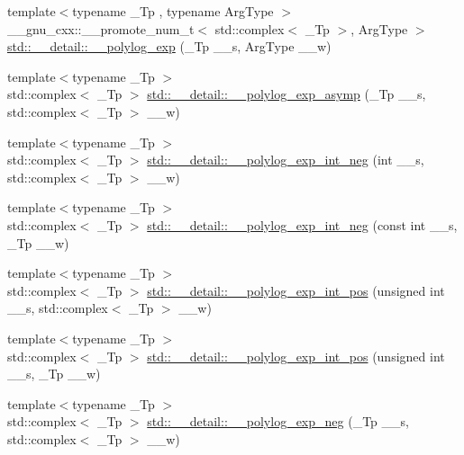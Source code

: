 \begin{DoxyCompactItemize}
\item 
{\footnotesize template$<$typename \+\_\+\+Tp , typename Arg\+Type $>$ }\\\+\_\+\+\_\+gnu\+\_\+cxx\+::\+\_\+\+\_\+promote\+\_\+num\+\_\+t$<$ std\+::complex$<$ \+\_\+\+Tp $>$, Arg\+Type $>$ \hyperlink{namespacestd_1_1____detail_ad01c033a96c9f185216d6c9f9db49c99}{std\+::\+\_\+\+\_\+detail\+::\+\_\+\+\_\+polylog\+\_\+exp} (\+\_\+\+Tp \+\_\+\+\_\+s, Arg\+Type \+\_\+\+\_\+w)
\item 
{\footnotesize template$<$typename \+\_\+\+Tp $>$ }\\std\+::complex$<$ \+\_\+\+Tp $>$ \hyperlink{namespacestd_1_1____detail_af3684fc449da490e9a43985245618a90}{std\+::\+\_\+\+\_\+detail\+::\+\_\+\+\_\+polylog\+\_\+exp\+\_\+asymp} (\+\_\+\+Tp \+\_\+\+\_\+s, std\+::complex$<$ \+\_\+\+Tp $>$ \+\_\+\+\_\+w)
\item 
{\footnotesize template$<$typename \+\_\+\+Tp $>$ }\\std\+::complex$<$ \+\_\+\+Tp $>$ \hyperlink{namespacestd_1_1____detail_a0857fa498441a0b3a6bf9e2d91cb6e86}{std\+::\+\_\+\+\_\+detail\+::\+\_\+\+\_\+polylog\+\_\+exp\+\_\+int\+\_\+neg} (int \+\_\+\+\_\+s, std\+::complex$<$ \+\_\+\+Tp $>$ \+\_\+\+\_\+w)
\item 
{\footnotesize template$<$typename \+\_\+\+Tp $>$ }\\std\+::complex$<$ \+\_\+\+Tp $>$ \hyperlink{namespacestd_1_1____detail_a7d1d29f2a53007e83c70e9ef805d0ffa}{std\+::\+\_\+\+\_\+detail\+::\+\_\+\+\_\+polylog\+\_\+exp\+\_\+int\+\_\+neg} (const int \+\_\+\+\_\+s, \+\_\+\+Tp \+\_\+\+\_\+w)
\item 
{\footnotesize template$<$typename \+\_\+\+Tp $>$ }\\std\+::complex$<$ \+\_\+\+Tp $>$ \hyperlink{namespacestd_1_1____detail_ade6f4296cf73408cb7e4e3efa58610e2}{std\+::\+\_\+\+\_\+detail\+::\+\_\+\+\_\+polylog\+\_\+exp\+\_\+int\+\_\+pos} (unsigned int \+\_\+\+\_\+s, std\+::complex$<$ \+\_\+\+Tp $>$ \+\_\+\+\_\+w)
\item 
{\footnotesize template$<$typename \+\_\+\+Tp $>$ }\\std\+::complex$<$ \+\_\+\+Tp $>$ \hyperlink{namespacestd_1_1____detail_a4915187dda5bbc8f089cfbbe6867f984}{std\+::\+\_\+\+\_\+detail\+::\+\_\+\+\_\+polylog\+\_\+exp\+\_\+int\+\_\+pos} (unsigned int \+\_\+\+\_\+s, \+\_\+\+Tp \+\_\+\+\_\+w)
\item 
{\footnotesize template$<$typename \+\_\+\+Tp $>$ }\\std\+::complex$<$ \+\_\+\+Tp $>$ \hyperlink{namespacestd_1_1____detail_a07b26b8c7ff467310e4e1df6e3efd893}{std\+::\+\_\+\+\_\+detail\+::\+\_\+\+\_\+polylog\+\_\+exp\+\_\+neg} (\+\_\+\+Tp \+\_\+\+\_\+s, std\+::complex$<$ \+\_\+\+Tp $>$ \+\_\+\+\_\+w)

\end{DoxyCompactItemize}

